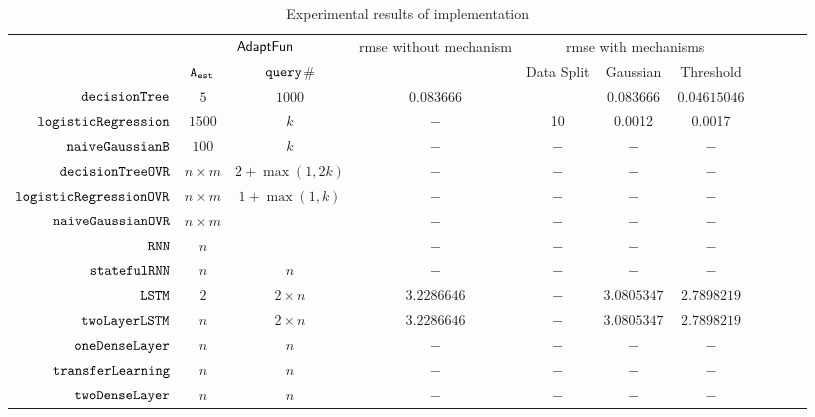 {\footnotesize
\begin {table}[H]
\vspace{-0.4cm}
    \caption{Experimental results of {\THESYSTEM} implementation}
    \vspace{-0.5cm}
        \label{tb:adapt-imp}
        \begin{center}
        \centering
{\tiny
        \begin{tabular}{| >{\tiny}r | c | c | c | c | c | c | c | c | c | c  }
         \hline \hline
        \multirow{2}{*}{Program $c$}
         & \multicolumn{2}{c|}{$\textsf{AdaptFun}$}
         & \multirow{2}{*}{rmse without mechanism}
         & \multicolumn{3}{c|}{rmse with mechanisms} \\ 
         \cline{2-3} \cline{5-7}
         & {${\mathtt{A_{est}}}$ } & {${\tt query}$\# } &  & Data Split & Gaussian & Threshold  \\ 
         \cline{6-7}
         \hline \hline
         $  \mathtt{decisionTree}$ & $5$ &  $1000$ & $0.083666$  & $  $ & $0.083666$ &$0.04615046$  \\
         $  \mathtt{logisticRegression}$ & $1500$ &  $k$ & $-$  &  10 & 0.0012 & 0.0017   \\
         $  \mathtt{naiveGaussianB}$ & $100$ & $k  $ &  $ -  $  &  $-$ & $-$ & $-$ \\
         $  \mathtt{decisionTreeOVR}$ & $n\times m$ &  $2+\max(1,2k)  $ &  $ -  $  &  $-$ & $-$ & $-$ \\
         $  \mathtt{logisticRegressionOVR}$    & $n\times m$ &  $1+ \max(1, k) $ &  $ -  $  &  $-$ & $-$ & $-$ \\
         $  \mathtt{naiveGaussianOVR}$ & $n\times m$ & $ $ &  $ -  $  &  $-$ & $-$ & $-$ \\
         $  \mathtt{RNN}$ & $n$ &   $ $ &  $ -  $  &  $-$ & $-$ & $-$  \\
         $  \mathtt{statefulRNN}$ & $n$ &   $ n $ &  $ -  $  &  $-$ & $-$ & $-$ \\
         $  \mathtt{LSTM}$ & $2$ &  $ 2 \times n $  &  $ 3.2286646  $  &  $-$ & $3.0805347$ & $2.7898219$  \\
         $  \mathtt{twoLayerLSTM}$ & $ n $ &  $ 2 \times n $  &  $ 3.2286646  $  &  $-$ & $3.0805347$ & $2.7898219$  \\
         $  \mathtt{oneDenseLayer}$ & $n$ & $ n $   &  $ -  $  &  $-$ & $-$ & $-$  \\
         {$ \mathtt{transferLearning}$} & $n$ &  $ n $ &  $ -  $  &  $-$ & $-$ & $-$ \\
         {$ \mathtt{twoDenseLayer}$} & $n$ &  $ n $ &  $ -  $  &  $-$ & $-$ & $-$  \\

\end{tabular}}
\end{center}
\end{table}}

